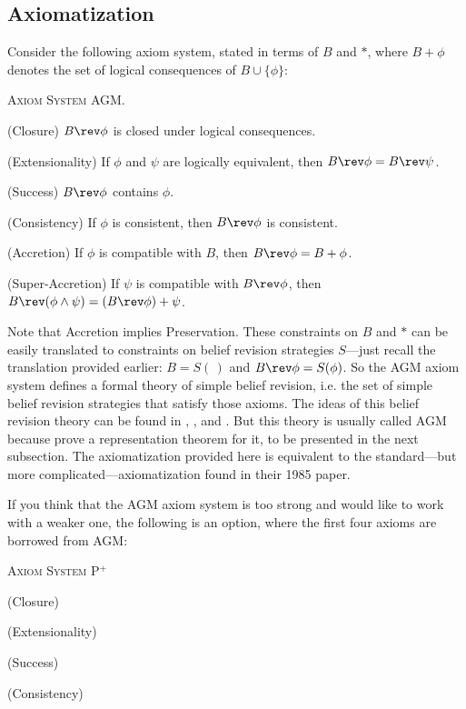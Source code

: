 \subsection{Axiomatization}\label{sec-agm}

Consider the following axiom system, stated in terms of $B$ and $*$, where $B + \phi$ denotes the set of logical consequences of $B \cup \{\phi\}$:\op

	\xm \textsc{Axiom System AGM.}

	\xm (Closure) $B \rev \phi$ is closed under logical consequences.

	\xm (Extensionality) If $\phi$ and $\psi$ are logically equivalent, then $B \rev \phi = B \rev \psi$. 

	\xm (Success) $B \rev \phi$ contains $\phi$.

	\xm (Consistency) If $\phi$ is consistent, then $B \rev \phi$ is consistent.

	\xm (Accretion) If $\phi$ is compatible with $B$, then $B \rev \phi = B + \phi$.

	\xm (Super-Accretion) If $\psi$ is compatible with $B \rev \phi$, then $B \rev (\phi \wedge \psi) = (B \rev \phi) + \psi$.

\ed Note that Accretion implies Preservation. These constraints on $B$ and $*$ can be easily translated to constraints on belief revision strategies $S$---just recall the translation provided earlier: $B = S(\,)$ and $B \rev \phi = S(\phi)$. So the AGM axiom system defines a formal theory of simple belief revision, i.e. the set of simple belief revision strategies that satisfy those axioms. The ideas of this belief revision theory can be found in \citet{harper1975rational}, \citet{harper1976rational}, and \citet{levi1978subjunctives}. But this theory is usually called AGM because \citet*{alchourron1985logic} prove a representation theorem for it, to be presented in the next subsection. The axiomatization provided here is equivalent to the standard---but more complicated---axiomatization found in their 1985 paper.

If you think that the AGM axiom system is too strong and would like to work with a weaker one, the following is an option, where the first four axioms are borrowed from AGM: \op

	\xm \textsc{Axiom System P$^{+}$}

	\xm (Closure)
	
	\xm (Extensionality)
	
	\xm (Success)
	
	\xm (Consistency) 
	
